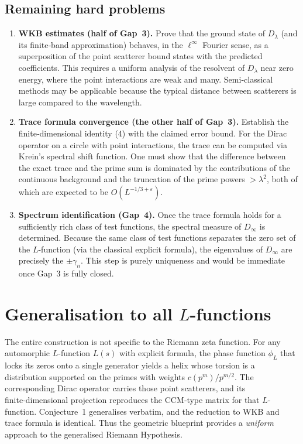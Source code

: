 \documentclass[12pt,a4paper]{article}
\begin{document}
\subsection*{Remaining hard problems}
\begin{enumerate}[label=Gap \arabic*:,leftmargin=*]
\item \textbf{WKB estimates (half of Gap~3).} Prove that the ground state of $D_\lambda$ (and its finite‑band approximation) behaves, in the $\ell^\infty$ Fourier sense, as a superposition of the point scatterer bound states with the predicted coefficients.  This requires a uniform analysis of the resolvent of $D_\lambda$ near zero energy, where the point interactions are weak and many.  Semi‑classical methods may be applicable because the typical distance between scatterers is large compared to the wavelength.
\item \textbf{Trace formula convergence (the other half of Gap~3).} Establish the finite‑dimensional identity (4) with the claimed error bound.  For the Dirac operator on a circle with point interactions, the trace can be computed via Krein's spectral shift function.  One must show that the difference between the exact trace and the prime sum is dominated by the contributions of the continuous background and the truncation of the prime powers $>\lambda^2$, both of which are expected to be $O(L^{-1/3+\varepsilon})$.
\item \textbf{Spectrum identification (Gap~4).} Once the trace formula holds for a sufficiently rich class of test functions, the spectral measure of $D_\infty$ is determined.  Because the same class of test functions separates the zero set of the $L$-function (via the classical explicit formula), the eigenvalues of $D_\infty$ are precisely the $\pm\gamma_n$.  This step is purely uniqueness and would be immediate once Gap~3 is fully closed.
\end{enumerate}

\section{Generalisation to all $L$-functions}
The entire construction is not specific to the Riemann zeta function.  For any automorphic $L$-function $L(s)$ with explicit formula, the phase function $\phi_L$ that locks its zeros onto a single generator yields a helix whose torsion is a distribution supported on the primes with weights $c(p^m)/p^{m/2}$.  The corresponding Dirac operator carries those point scatterers, and its finite‑dimensional projection reproduces the CCM‑type matrix for that $L$-function.  Conjecture~1 generalises verbatim, and the reduction to WKB and trace formula is identical.  Thus the geometric blueprint provides a \emph{uniform} approach to the generalised Riemann Hypothesis.
\end{document}
